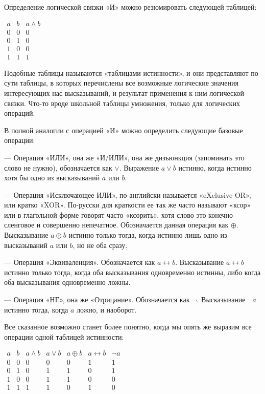 Определение логической связки «И» можно резюмировать следующей таблицей:

$\begin{array}{cc|c}a & b & a \wedge b \\ \hline 0 & 0 & 0 \\ 0&1&0 \\ 1&0&0 \\ 1&1&1\end{array}$

Подобные таблицы называются «таблицами истинности», и они представляют по сути таблицы, в которых перечислены все возможные логические значения интересующих нас высказываний, и результат применения к ним логической связки. Что-то вроде школьной таблицы умножения, только для логических операций.

В полной аналогии с операцией «И» можно определить следующие базовые операции:

— Операция «ИЛИ», она же «И/ИЛИ», она же дизъюнкция (запоминать это слово не нужно), обозначается как $\vee$. Выражение $a\vee b$ истинно, когда истинно хотя бы одно из высказываний $a$ или $b$.

— Операция «Исключающее ИЛИ», по-английски называется «eXclusive OR», или кратко «XOR». По-русски для краткости ее так же часто называют «ксор» или в глагольной форме говорят часто «ксорить», хотя слово это конечно сленговое и совершенно непечатное. Обозначается данная операция как $\oplus$. Высказывание $a \oplus b$ истинно только тогда, когда истинно лишь одно из высказываний $a$ или $b$, но не оба сразу.

— Операция «Эквиваленция». Обозначается как $a \leftrightarrow b$. Высказывание $a \leftrightarrow b$ истинно только тогда, когда оба высказывания одновременно истинны, либо когда оба высказывания одновременно ложны.

— Операция «НЕ», она же «Отрицание». Обозначается как $\neg$. Высказывание $\neg a$ истинно тогда, когда $a$ ложно, и наоборот.

Все сказанное возможно станет более понятно, когда мы опять же выразим все операции одной таблицей истинности:

$\begin{array}{cc|ccccc}a&b&a\wedge b&a\vee b&a\oplus b&a\leftrightarrow b & \neg a\\\hline 0&0&0&0&0&1&1 \\ 0&1&0&1&1&0&1 \\ 1&0&0&1&1&0&0 \\ 1&1&1&1&0&1&0\end{array}$


